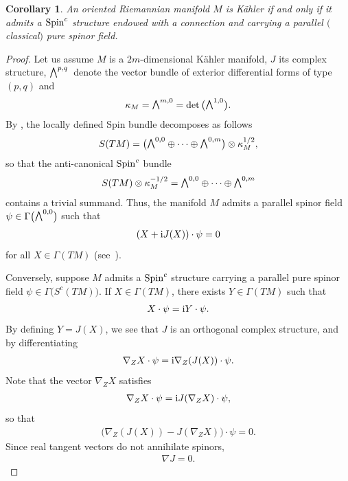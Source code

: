 \documentclass[10pt,a4paper]{amsart}
\newcommand{\ext}{\raise1pt\hbox{\small$\bigwedge$}}
\numberwithin{equation}{section}
\newtheorem{Corollary}[Theorem]{Corollary}
\begin{document}
\begin{Corollary} An oriented Riemannian manifold $M$ is K\"ahler if and only if it admits a ${\rm Spin}^c$ structure endowed with a connection and carrying a parallel $($classical$)$ pure spinor field.
\end{Corollary}
\begin{proof} Let us assume $M$ is a $2m$-dimensional K\"ahler manifold, $J$ its complex structure, $\ext^{p,q}$~denote the vector bundle of exterior differential forms of type $(p,q)$ and
\begin{gather*}\kappa_M=\ext^{m,0}= \det\big(\ext^{1,0}\big).\end{gather*}
By \cite{Hitchin}, the locally defined Spin bundle decomposes as follows
\begin{gather*}S(TM) = \big(\ext^{0,0}\oplus \cdots \oplus \ext^{0,m}\big)\otimes \kappa_M^{1/2},\end{gather*}
so that the anti-canonical ${\rm Spin}^c$ bundle
\begin{gather*}S(TM)\otimes \kappa_M^{-1/2} =\ext^{0,0}\oplus \cdots \oplus \ext^{0,m}\end{gather*}
contains a trivial summand. Thus, the manifold $M$ admits a parallel spinor field $\psi\in \Gamma\big(\ext^{0,0}\big)$ such that
\begin{gather*}(X+{\rm i}J(X))\cdot\psi=0\end{gather*}
for all $X\in \Gamma(TM)$ (see~\cite{Friedrich}).

Conversely, suppose $M$ admits a ${\rm Spin}^c$ structure carrying a parallel pure spinor field $\psi\in \Gamma \big(S^c(TM)\big)$. If $X\in \Gamma(TM)$, there exists $Y\in \Gamma(TM)$ such that
\begin{gather*}X\cdot \psi= {\rm i} Y\cdot \psi.\end{gather*}
By defining $Y=J(X)$, we see that $J$ is an orthogonal complex structure, and by differentiating
\begin{gather*}\nabla_ZX\cdot \psi = {\rm i} \nabla_Z(J(X))\cdot \psi.\end{gather*}
Note that the vector $\nabla_ZX$ satisfies
\begin{gather*}\nabla_ZX\cdot \psi= {\rm i} J(\nabla_ZX)\cdot \psi,\end{gather*}
so that
\begin{gather*}\big(\nabla_Z(J(X))-J(\nabla_ZX)\big)\cdot \psi=0.\end{gather*}
Since real tangent vectors do not annihilate spinors,
\begin{gather*}\nabla J=0.\tag*{\qed}\end{gather*}\renewcommand{\qed}{}
\end{proof}
\end{document}

